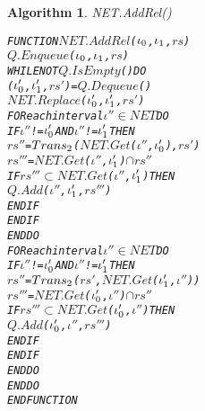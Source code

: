 \documentclass[11pt]{report}
\newenvironment{vverbatim}
{
  \begin{alltt}
}
{
    \vspace{-\baselineskip}
  \end{alltt}
}
\newtheorem{vvalgorithm}{Algorithm}[chapter]
\newenvironment{valgorithm}[2]
{
  \begin{vvalgorithm}{#1}
    \label{#2}
    \small
    \begin{vverbatim}
}
{
    \end{vverbatim}
  \end{vvalgorithm}
}
\begin{document}
          \begin{valgorithm}{NET.AddRel()}{algo-tempo-ntadr}
FUNCTION \(NET.AddRel\)(\(\iota\sb{0}\), \(\iota\sb{1}\), \(rs\))
  \(Q.Enqueue\)(\(\iota\sb{0}\), \(\iota\sb{1}\), \(rs\))
  WHILE NOT \(Q.IsEmpty\)() DO
    (\(\iota\sb{0}'\), \(\iota\sb{1}'\), \(rs'\)) = \(Q.Dequeue\)()
    \(NET.Replace\)(\(\iota\sb{0}'\), \(\iota\sb{1}'\), \(rs'\))
    FOR each interval \(\iota''\) \(\in\) \(NET\) DO
      IF \(\iota''\) != \(\iota\sb{0}'\) AND \(\iota''\) != \(\iota\sb{1}'\) THEN
        \(rs''\) =  \(Trans\sb{2}\)(\(NET.Get\)(\(\iota''\), \(\iota\sb{0}'\)), \(rs'\))
        \(rs'''\) = \(NET.Get\)(\(\iota''\), \(\iota\sb{1}'\)) \(\cap\) \(rs''\)
        IF \(rs'''\) \(\subset\) \(NET.Get\)(\(\iota''\), \(\iota\sb{1}'\)) THEN
          \(Q.Add\)(\(\iota''\), \(\iota\sb{1}'\), \(rs'''\))
        ENDIF
      ENDIF
    ENDDO
    FOR each interval \(\iota''\) \(\in\) \(NET\) DO
      IF \(\iota''\) != \(\iota\sb{0}'\) AND \(\iota''\) != \(\iota\sb{1}'\) THEN
        \(rs''\) =  \(Trans\sb{2}\)(\(rs'\), \(NET.Get\)(\(\iota\sb{1}'\), \(\iota''\)))
        \(rs'''\) = \(NET.Get\)(\(\iota\sb{0}'\), \(\iota''\)) \(\cap\) \(rs''\)
        IF \(rs'''\) \(\subset\) \(NET.Get\)(\(\iota\sb{0}'\), \(\iota''\)) THEN
          \(Q.Add\)(\(\iota\sb{0}'\), \(\iota''\), \(rs'''\))
        ENDIF
      ENDIF
    ENDDO
  ENDDO
ENDFUNCTION
          \end{valgorithm}
\end{document}
